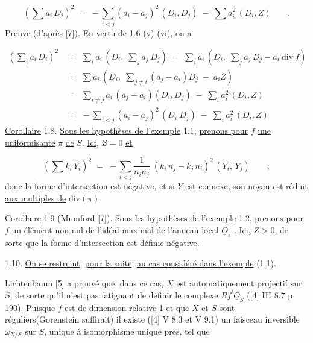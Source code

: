 \begin{equation*}
(\sum a_i\, D_i)^2 \;=\; -\sum_{i<j} (a_i - a_j)^2\, (D_i, D_j) \;-\; \sum a_i^2\, (D_i, Z) \qquad .
\end{equation*}
\underline{Preuve} (d'après [7]). En vertu de 1.6 (v) (vi), on a

\begin{equation*}
\begin{aligned}
(\sum_i a_i\, D_i)^2 \;&=\; \sum_i a_i\, (D_i,\; \sum_j a_j\, D_j) \;=\; \sum_i a_i\, (D_i,\; \sum_j a_j\, D_j - a_i\ \mathrm{div}\ f) \\[2pt]
&=\; \sum a_i\, (D_i,\; \sum_{j \neq i} (a_j - a_i) D_j \;-\; a_i Z) \\[2pt]
&=\; \sum_{i \neq j} a_i\, (a_j - a_i)(D_i, D_j) \;-\; \sum_i a_i^2\, (D_i, Z) \\[2pt]
&=\; -\sum_{i<j} (a_i - a_j)^2\, (D_i\ D_j) \;-\; \sum_i a_i^2\, (D_i, Z)
\end{aligned}
\end{equation*}
\underline{Corollaire} 1.8. \underline{Sous les hypothèses de l'exemple} 1.1, \underline{prenons pour} $f$ \underline{une uniformisante} $\pi$ \underline{de} $S$. \underline{Ici}, $Z = 0$ \underline{et}

\begin{equation*}
(\sum k_i\, Y_i)^2 \;=\; -\sum_{i<j} \frac{1}{n_i n_j}\; (k_i\, n_j - k_j\, n_i)^2\, (Y_i,\, Y_j) \qquad ;
\end{equation*}
\underline{donc la forme d'intersection est négative}, \underline{et si} $Y$ \underline{est connexe}, \underline{son noyau est réduit aux multiples de} $\mathrm{div}(\pi)$.

\underline{Corollaire} 1.9 (Mumford [7]). \underline{Sous les hypothèses de l'exemple} 1.2, \underline{prenons pour} $f$ \underline{un élément non nul de l'idéal maximal de l'anneau local} $\underline{O}_s$ . \underline{Ici}, $Z > 0$, \underline{de sorte que la forme d'intersection est définie négative}.



1.10. \underline{On se restreint}, \underline{pour la suite}, \underline{au cas considéré dans l'exemple} (1.1).

Lichtenbaum [5] a prouvé que, dans ce cas, $X$ est automatiquement projectif sur $S$, de sorte qu'il n'est pas fatiguant de définir le complexe $Rf^{!}\underline{O}_S$ ([4] III 8.7 p. 190). Puisque $f$ est de dimension relative 1 et que $X$ et $S$ sont réguliers(Gorenstein suffirait) il existe ([4] V 8.3 et V 9.1) un faisceau inversible $\omega_{X/S}$ sur $S$, unique à isomorphisme unique près, tel que

